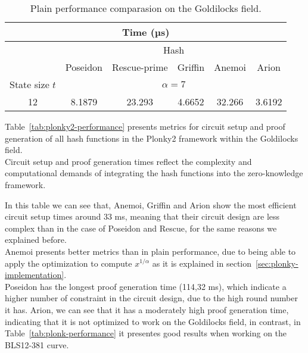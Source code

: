 \begin{table}[htbp]
  \centering
  \begin{tabular}{@{}cclllc@{}}
  \toprule
  \multicolumn{6}{c}{Time (µs)}                                \\ \midrule
  \multicolumn{1}{l|}{}               & \multicolumn{5}{c}{Hash}       \\ \cmidrule(l){2-6} 
  \multicolumn{1}{l|}{}   & \multicolumn{1}{l}{Poseidon} & Rescue-prime                  & Griffin                       & Anemoi                        & Arion     \\ \midrule
  \multicolumn{1}{c|}{State size $t$} & \multicolumn{5}{c}{$\alpha=7$} \\ \midrule
  \multicolumn{1}{c|}{12} & 8.1879                    & \multicolumn{1}{c}{23.293} & \multicolumn{1}{c}{4.6652} & \multicolumn{1}{c}{32.266} & 3.6192 \\ \bottomrule
  \end{tabular}
  \caption{Plain performance comparasion on the Goldilocks field.}
  \label{tab:goldi-plain-performance}
  \end{table}

Table~\ref{tab:plonky2-performance} presents metrics for circuit setup and proof generation of all hash functions in the Plonky2 framework within the Goldilocks field.\\
Circuit setup and proof generation times reflect the complexity and computational demands of integrating the hash functions into the zero-knowledge framework.

In this table we can see that, Anemoi, Griffin and Arion show the most efficient circuit setup times around 33 ms, meaning that their circuit design are less complex than in the case of Poseidon and Rescue, for the same reasons we explained before.\\
Anemoi presents better metrics than in plain performance, due to being able to apply the optimization to compute $x^{1/\alpha}$ as it is explained in section~\ref{sec:plonky-implementation}.\\
Poseidon has the longest proof generation time (114,32 ms), which indicate a higher number of constraint in the circuit design, due to the high round number it has. Arion, we can see that it has a moderately high proof generation time, indicating that it is not optimized to work on the Goldilocks field, in contrast, in Table~\ref{tab:plonk-performance} it presentes good results when working on the BLS12-381 curve.

